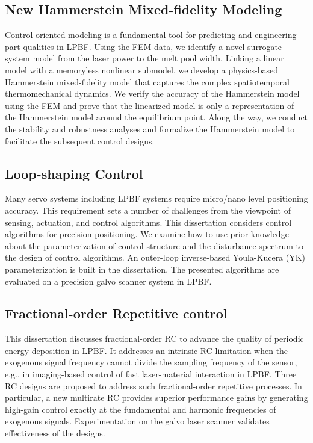 \documentclass [11pt, proquest] {uwthesis}[2020/02/24]
\begin{document}
\subsection*{New Hammerstein Mixed-fidelity Modeling}
Control-oriented modeling is a fundamental tool
for predicting and engineering part qualities in LPBF. Using
the FEM data, we identify a novel surrogate system model from the
laser power to the melt pool width. Linking a linear model with
a memoryless nonlinear submodel, we develop a physics-based Hammerstein
mixed-fidelity model that captures the complex spatiotemporal thermomechanical dynamics.
We verify the accuracy of the Hammerstein model using the FEM and
prove that the linearized model is only a representation of the Hammerstein
model around the equilibrium point. Along the way, we conduct the
stability and robustness analyses and formalize the Hammerstein model
to facilitate the subsequent control designs.

\subsection*{Loop-shaping Control}
Many servo systems including LPBF systems require micro/nano level positioning accuracy. This requirement sets a number of challenges from the viewpoint of sensing, actuation, and control algorithms. This dissertation considers control algorithms for precision positioning. We examine how to use prior knowledge about the parameterization of control structure and the disturbance spectrum to the design of control algorithms. An outer-loop inverse-based Youla-Kucera (YK) parameterization is built in the dissertation. The presented algorithms are evaluated on a precision galvo scanner system in LPBF.

\subsection*{Fractional-order Repetitive control}
This dissertation discusses fractional-order RC to advance
the quality of periodic energy deposition in LPBF. It addresses an intrinsic RC limitation when the
exogenous signal frequency cannot divide the sampling frequency of
the sensor, e.g., in imaging-based control of fast laser-material
interaction in LPBF. Three RC designs are proposed to address such fractional-order
repetitive processes. In particular, a new multirate RC provides superior
performance gains by generating high-gain control exactly at the fundamental
and harmonic frequencies of exogenous signals. Experimentation on
the galvo laser scanner validates effectiveness of the designs.
\end{document}
